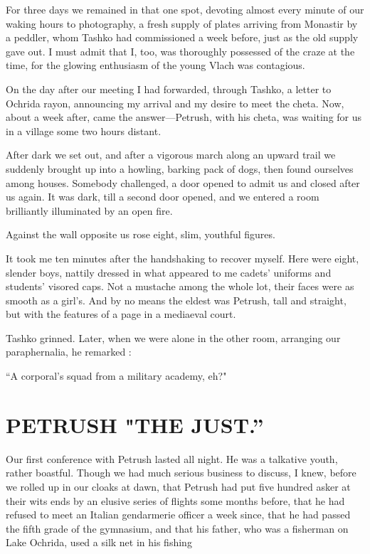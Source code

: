 \documentclass[a5paper,12pt]{book}
\begin{document}
For three days we remained in that one spot, devoting almost every minute of our waking hours to photography, a fresh supply of plates arriving from Monastir by a peddler, whom Tashko had commissioned a week before, just as the old supply gave out. I must admit that I, too, was thoroughly possessed of the craze at the time, for the glowing enthusiasm of the young Vlach was contagious. 

On the day after our meeting I had forwarded, through Tashko, a letter to Ochrida rayon, announcing my arrival and my desire to meet the cheta. Now, about a week after, came the answer—Petrush, with his cheta, was waiting for us in a village some two hours distant. 

After dark we set out, and after a vigorous march along an upward trail we suddenly brought up into a howling, barking pack of dogs, then found ourselves among houses. Somebody challenged, a door opened to admit us and closed after us again. It was dark, till a second door opened, and we entered a room brilliantly illuminated by an open fire. 

Against the wall opposite us rose eight, slim, youthful figures. 

It took me ten minutes after the handshaking to recover myself. Here were eight, slender boys, nattily dressed in what appeared to me cadets' uniforms and students' visored caps. Not a mustache among the whole lot, their faces were as smooth as a girl's. And by no means the eldest was Petrush, tall and straight, but with the features of a page in a mediaeval court. 

Tashko grinned. Later, when we were alone in the other room, arranging our paraphernalia, he remarked : 

“A corporal’s squad from a military academy, eh?" 


\chapter{PETRUSH "THE JUST.”}

Our first conference with Petrush lasted all night. He was a talkative youth, rather boastful. Though we had much serious business to discuss, I knew, before we rolled up in our cloaks at dawn, that Petrush had put five hundred asker at their wits ends by an elusive series of flights some months before, that he had refused to meet an Italian gendarmerie officer a week since, that he had passed the fifth grade of the gymnasium, and that his father, who was a fisherman on Lake Ochrida, used a silk net in his fishing 
\end{document}
